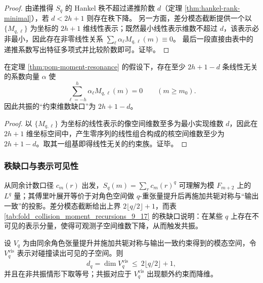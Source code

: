 \begin{proof}
由递推得 \(S_q\) 的 Hankel 秩不超过递推阶数 \(d\)（定理 \ref{thm:hankel-rank-minimal}），若 \(d<2h+1\) 则存在秩下降。
另一方面，差分模态截断提供一个以 \(\{M_{q,\ell}\}\) 为坐标的 \(2h+1\) 维线性表示；既然最小线性表示维数不超过 \(d\)，该表示必非最小，因此存在非零线性关系 \(\sum_{\ell}\alpha_\ell M_{q,\ell}(m)\equiv 0\)。
最后一段直接由表中的递推系数写出特征多项式并比较阶数即可。证毕。
\end{proof}

\begin{corollary}[模态约束的维数缺口]\label{cor:pom-resonance-deficit}
在定理 \ref{thm:pom-moment-resonance} 的假设下，存在至少
\(
2h+1-d
\)
条线性无关的系数向量 $\alpha$ 使
\[
\sum_{\ell=-h}^{h}\alpha_\ell M_{q,\ell}(m)=0\qquad(m\ge m_0).
\]
因此共振的“约束维数缺口”为 $2h+1-d$。
\end{corollary}
\begin{proof}
以 $\{M_{q,\ell}\}$ 为坐标的线性表示的像空间维数至多为最小实现维数 $d$，因此在 $2h+1$ 维坐标空间中，产生零序列的线性组合构成的核空间维数至少为 $2h+1-d$。取其一组基即得线性无关的约束族。证毕。
\end{proof}

\subsubsection{秩缺口与表示可见性}\label{subsec:pom-moment-visibility}
从同余计数口径 \(c_m(r)\) 出发，\(S_q(m)=\sum_r c_m(r)^q\) 可理解为模 \(F_{m+2}\) 上的 \(L^q\) 量；其傅里叶展开等价于对角色空间做 \(q\)-重张量提升后再施加共轭对称与“输出一致”的投影。差分模态截断给出上界 \(2\lfloor q/2\rfloor+1\)，而表 \ref{tab:fold_collision_moment_recursions_9_17} 的秩缺口说明：在某些 \(q\) 上存在不可见的表示分量，使得可观测子空间维数下降，从而触发共振。

\begin{conjecture}[模态可见性与闭合维数]\label{conj:pom-moment-visible}
设 \(V_q\) 为由同余角色张量提升并施加共轭对称与输出一致约束得到的模态空间，令 \(V_q^{\mathrm{vis}}\) 表示对碰撞读出可见的子空间。则
\[
d_q=\dim V_q^{\mathrm{vis}}\ \le\ 2\lfloor q/2\rfloor+1,
\]
并且在非共振情形下取等号；共振对应于 \(V_q^{\mathrm{vis}}\) 出现额外约束而降维。
\end{conjecture}

